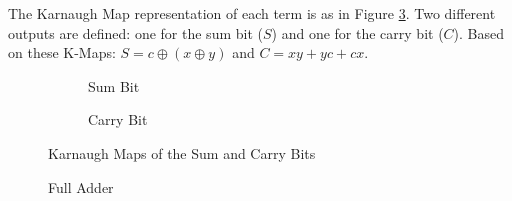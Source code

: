 \documentclass[12pt]{article}
\begin{document}
The Karnaugh Map representation of each term is as in Figure \ref{fig:adderKarnaugh}. Two
different outputs are defined: one for the sum bit ($S$) and one for the carry bit ($C$).
Based on these K-Maps: $S = c \oplus (x \oplus y)$ and $C = xy+yc+cx$.

\begin{figure}[H]
  \begin{subfigure}[H]{0.45\textwidth}
    \centering
    
    \caption{Sum Bit}
    \label{fig:015}
  \end{subfigure}
  \begin{subfigure}[H]{0.45\textwidth}
    \centering
    
    \caption{Carry Bit}
    \label{fig:016}
  \end{subfigure}
  \caption{Karnaugh Maps of the Sum and Carry Bits}
  \label{fig:adderKarnaugh}
\end{figure}

\newpage
\vfill
\begin{figure}[H]
  \centering
  
  \caption{Full Adder}
  \label{fig:014}
\end{figure}
\vfill
\newpage
\end{document}
